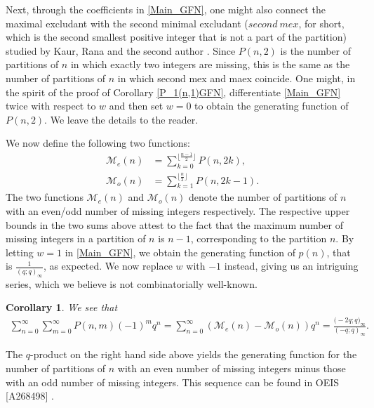 \documentclass[12pt,reqno]{amsart}
\renewcommand{\(}{\left\(}
\renewcommand{\)}{\right\)}
\renewcommand{\[}{\left\[}
\renewcommand{\]}{\right\]}
\numberwithin{equation}{section}
\theoremstyle{plain}
\newtheorem{corollary}[theorem]{Corollary}
\begin{document}
Next, through the coefficients in \eqref{Main_GFN}, one might also connect the maximal excludant with the second minimal excludant ($second \ mex$, for short, which is the second smallest positive integer that is not a part of the partition) studied by Kaur, Rana and the second author \cite{KRE24}. Since $P(n,2)$ is the number of partitions of $n$ in which exactly two integers are missing, this is the same as the number of partitions of $n$ in which second mex and maex coincide. One might, in the spirit of the proof of Corollary \ref{P_1(n,1)GFN}, differentiate \eqref{Main_GFN} twice with respect to $w$ and then set $w=0$ to obtain the generating function of $P(n, 2)$. We leave the details to the reader.

We now define the following two functions: 
\begin{align*}
\mathcal{M}_e(n) &=\sum_{k=0}^{\lfloor \frac{n-1}{2} \rfloor}P(n, 2k),\\
\mathcal{M}_o(n) &=\sum_{k=1}^{\lfloor \frac{n}{2} \rfloor}P(n, 2k-1).
\end{align*}
The two functions $\mathcal{M}_e(n)$ and $\mathcal{M}_o(n)$ denote the number of partitions of $n$ with an even/odd number of missing integers respectively. The respective upper bounds in the two sums above attest to the fact that the maximum number of missing integers in a partition of $n$ is $n-1$, corresponding to the partition $n$. By letting $w=1$ in \eqref{Main_GFN}, we obtain the generating function of $p(n)$, that is $\frac{1}{(q;q)_{\infty}}$, as expected. We now replace $w$ with $-1$ instead, giving us an intriguing series, which we believe is not combinatorially well-known.
\begin{corollary}
We see that
\begin{align*} 
\sum_{n=0}^{\infty}\sum_{m=0}^{\infty} P(n,m)(-1)^mq^n=\sum_{n=0}^{\infty}\left(\mathcal{M}_e(n)-\mathcal{M}_o(n)\right)q^n=\frac{\big(-2q;q\big)_{\infty}}{(-q;q)_{\infty}}. %
\end{align*}
\end{corollary}
The $q$-product on the right hand side above yields the generating function for the number of partitions of $n$ with an even number of missing integers minus those with an odd number of missing integers. This sequence can be found in OEIS [A268498] \cite{OEIS}.
\end{document}
